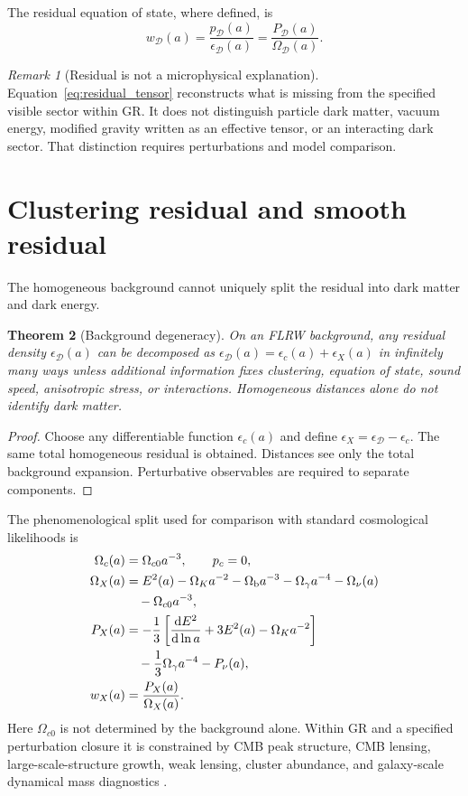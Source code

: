 \documentclass[
  aps,
  prd,
  reprint,
  superscriptaddress,
  nofootinbib,
  floatfix,
  longbibliography
]{revtex4-2}
\theoremstyle{plain}
\newtheorem{theorem}{Theorem}[section]
\theoremstyle{definition}
\theoremstyle{remark}
\newtheorem{remark}[theorem]{Remark}
\newcommand{\dd}{\mathrm d}
\newcommand{\D}{\mathcal D}
\newcommand{\Omk}{\Omega_K}
\newcommand{\Ob}{\Omega_{\rm b}}
\newcommand{\Og}{\Omega_\gamma}
\newcommand{\Onu}{\Omega_\nu}
\newcommand{\OD}{\Omega_{\D}}
\newcommand{\PD}{P_{\D}}
\begin{document}
The residual equation of state, where defined, is
\begin{equation}
w_{\D}(a)=\frac{p_{\D}(a)}{\epsilon_{\D}(a)}
=\frac{\PD(a)}{\OD(a)} .
\label{eq:wD}
\end{equation}

\begin{remark}[Residual is not a microphysical explanation]
Equation~\eqref{eq:residual_tensor} reconstructs what is missing from the
specified visible sector within GR.  It does not distinguish particle dark
matter, vacuum energy, modified gravity written as an effective tensor, or an
interacting dark sector.  That distinction requires perturbations and model
comparison.
\end{remark}

\section{Clustering residual and smooth residual}

The homogeneous background cannot uniquely split the residual into dark matter
and dark energy.

\begin{theorem}[Background degeneracy]
On an FLRW background, any residual density $\epsilon_\D(a)$ can be decomposed
as $\epsilon_\D(a)=\epsilon_c(a)+\epsilon_X(a)$ in infinitely many ways unless
additional information fixes clustering, equation of state, sound speed,
anisotropic stress, or interactions.  Homogeneous distances alone do not
identify dark matter.
\end{theorem}

\begin{proof}
Choose any differentiable function $\epsilon_c(a)$ and define
$\epsilon_X=\epsilon_\D-\epsilon_c$.  The same total homogeneous residual is
obtained.  Distances see only the total background expansion.  Perturbative
observables are required to separate components.
\end{proof}

The phenomenological split used for comparison with standard cosmological
likelihoods is
\begin{align}
\Omega_c(a)&=\Omega_{c0}a^{-3},\qquad p_c=0,
\label{eq:cold_dm}\\
\Omega_X(a)&=E^2(a)-\Omk a^{-2}
-\Ob a^{-3}-\Og a^{-4}-\Onu(a)
\nonumber\\
&\quad -\Omega_{c0}a^{-3},
\label{eq:OmegaX}\\
P_X(a)&=-\frac13\left[\frac{\dd E^2}{\dd\ln a}
+3E^2(a)-\Omk a^{-2}\right]
\nonumber\\
&\quad -\frac13\Og a^{-4}-P_\nu(a),
\label{eq:PX}\\
w_X(a)&=\frac{P_X(a)}{\Omega_X(a)}.
\label{eq:wX}
\end{align}
Here $\Omega_{c0}$ is not determined by the background alone.  Within GR and a
specified perturbation closure it is constrained by CMB peak structure, CMB
lensing, large-scale-structure growth, weak lensing, cluster abundance, and
galaxy-scale dynamical mass diagnostics
\cite{Planck2018VI,ACTDR62024,DESY32022,BulletCluster2006,SPARC2016}.
\end{document}
